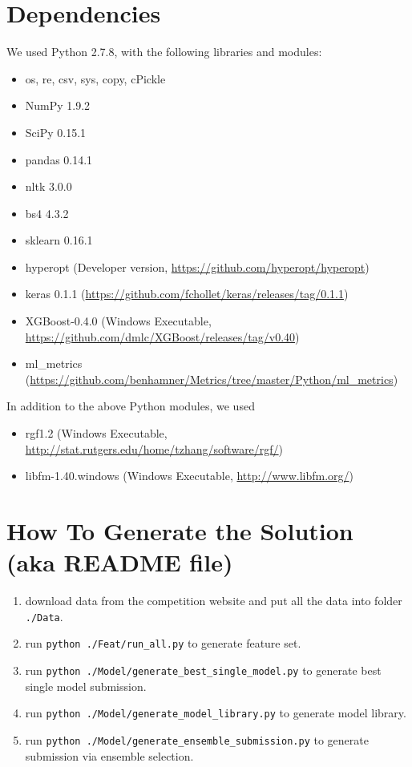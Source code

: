 \documentclass[12pt]{article}
\begin{document}
\section{Dependencies}
We used Python 2.7.8, with the following libraries and modules:
\begin{itemize}
\item os, re, csv, sys, copy, cPickle
\item NumPy 1.9.2
\item SciPy 0.15.1
\item pandas 0.14.1
\item nltk 3.0.0
\item bs4 4.3.2
\item sklearn 0.16.1
\item hyperopt (Developer version, \url{https://github.com/hyperopt/hyperopt})
\item keras 0.1.1 (\url{https://github.com/fchollet/keras/releases/tag/0.1.1})
\item XGBoost-0.4.0 (Windows Executable, \url{https://github.com/dmlc/XGBoost/releases/tag/v0.40})
\item ml\_metrics (\url{https://github.com/benhamner/Metrics/tree/master/Python/ml_metrics})
\end{itemize}
In addition to the above Python modules, we used
\begin{itemize}
\item rgf1.2 (Windows Executable, \url{http://stat.rutgers.edu/home/tzhang/software/rgf/})
\item libfm-1.40.windows (Windows Executable, \url{http://www.libfm.org/})
\end{itemize}

\section{How To Generate the Solution (aka README file)}
\begin{enumerate}
\item download data from the competition website and put all the data into folder \texttt{./Data}.
\item run \texttt{python ./Feat/run\_all.py} to generate feature set.
\item run \texttt{python ./Model/generate\_best\_single\_model.py} to generate best single model submission.
\item run \texttt{python ./Model/generate\_model\_library.py} to generate model library.
\item run \texttt{python ./Model/generate\_ensemble\_submission.py} to generate submission via ensemble selection.
\end{enumerate}
\end{document}
